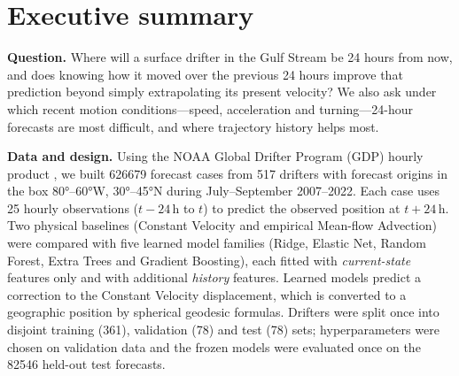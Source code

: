 \section*{Executive summary}

\textbf{Question.} Where will a surface drifter in the Gulf Stream be 24 hours from now, and does knowing how it moved over the previous 24 hours improve that prediction beyond simply extrapolating its present velocity? We also ask under which recent motion conditions---speed, acceleration and turning---24-hour forecasts are most difficult, and where trajectory history helps most.

\textbf{Data and design.} Using the NOAA Global Drifter Program (GDP) hourly product \citep{elipot2016,gdpdata2022}, we built \num{626679} forecast cases from \num{517} drifters with forecast origins in the box \ang{80}--\ang{60}W, \ang{30}--\ang{45}N during July--September 2007--2022. Each case uses 25 hourly observations ($t-24$\,h to $t$) to predict the observed position at $t+24$\,h. Two physical baselines (Constant Velocity and empirical Mean-flow Advection) were compared with five learned model families (Ridge, Elastic Net, Random Forest, Extra Trees and Gradient Boosting), each fitted with \emph{current-state} features only and with additional \emph{history} features. Learned models predict a correction to the Constant Velocity displacement, which is converted to a geographic position by spherical geodesic formulas. Drifters were split once into disjoint training (361), validation (78) and test (78) sets; hyperparameters were chosen on validation data and the frozen models were evaluated once on the \num{82546} held-out test forecasts.

